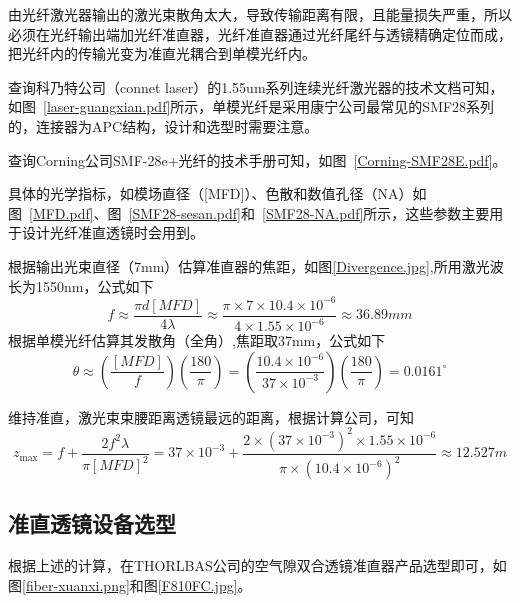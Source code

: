 
由光纤激光器输出的激光束散角太大，导致传输距离有限，且能量损失严重，所以必须在光纤输出端加光纤准直器，光纤准直器通过光纤尾纤与透镜精确定位而成，把光纤内的传输光变为准直光耦合到单模光纤内。

查询科乃特公司（connet laser）的1.55um系列连续光纤激光器的技术文档可知，如图~\ref{laser-guangxian.pdf}所示，单模光纤是采用康宁公司最常见的SMF28系列的，连接器为APC结构，设计和选型时需要注意。


查询Corning公司SMF-28e+光纤的技术手册可知，如图~\ref{Corning-SMF28E.pdf}。


具体的光学指标，如模场直径（[MFD]）、色散和数值孔径（NA）如图~\ref{MFD.pdf}、图~\ref{SMF28-sesan.pdf}和~\ref{SMF28-NA.pdf}所示，这些参数主要用于设计光纤准直透镜时会用到。


根据输出光束直径（7mm）估算准直器的焦距，如图\ref{Divergence.jpg},所用激光波长为1550nm，公式如下
$$ f \approx \frac { \pi d [ M F D ]} {  4 \lambda  }  \approx \frac { \pi \times 7 \times 10.4 \times 10^{-6}} {  4 \times 1.55 \times 10^{-6}  } \approx 36.89 mm $$
根据单模光纤估算其发散角（全角）,焦距取37mm，公式如下
$$ \theta \approx \left( \frac { [ M F D ] } { f } \right) \left( \frac { 180 } { \pi } \right) =  \left( \frac { 10.4 \times 10^{-6}} { 37 \times 10^{-3} } \right) \left( \frac { 180 } { \pi } \right) =  0.0161 ^{\circ} $$

维持准直，激光束束腰距离透镜最远的距离，根据计算公司，可知
$$ z _ { \max } = f + \frac { 2 f ^ { 2 } \lambda } { \pi [ M F D ] ^ { 2 } } =  37\times 10^{-3} + \frac { 2 \times\left(37\times 10^{-3}\right)^ { 2 } \times 1.55\times 10^{-6} } { \pi \times\left({10.4\times 10^{-6}} \right)^ { 2 } } \approx 12.527 m  $$

\subsection{准直透镜设备选型}
根据上述的计算，在THORLBAS公司的空气隙双合透镜准直器产品选型即可，如图\ref{fiber-xuanxi.png}和图\ref{F810FC.jpg}。

